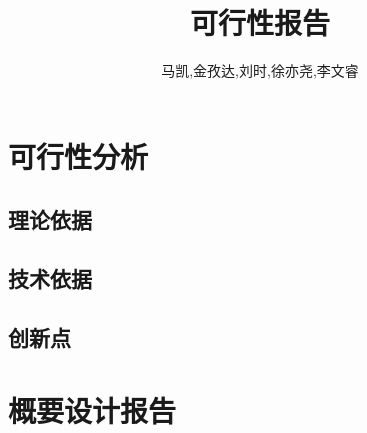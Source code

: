 \documentclass{ctexart}
\begin{document}
\title{可行性报告}
\author{马凯,金孜达,刘时,徐亦尧,李文睿}
\setcounter{tocdepth}{2}
\maketitle
\tableofcontents
\newpage

\section{可行性分析}
\subsection{理论依据}
\subsection{技术依据}
\subsection{创新点}

\section{概要设计报告}
\end{document}
